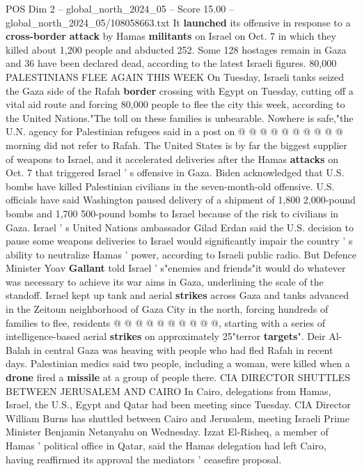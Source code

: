 \begin{textsample}{POS Dim 2 – global\_north\_2024\_05 – Score 15.00 – global\_north\_2024\_05/108058663.txt}
It \textbf{launched} its offensive in response to a \textbf{cross-border} \textbf{attack} by Hamas \textbf{militants} on Israel on Oct. 7 in which they killed about 1,200 people and abducted 252.
Some 128 hostages remain in Gaza and 36 have been declared dead, according to the latest Israeli figures. 80,000 PALESTINIANS FLEE AGAIN THIS WEEK On Tuesday, Israeli tanks seized the Gaza side of the Rafah \textbf{border} crossing with Egypt on Tuesday, cutting off a vital aid route and forcing 80,000 people to flee the city this week, according to the United Nations."The toll on these families is unbearable.
Nowhere is safe,"the U.N. agency for Palestinian refugees said in a post on @ @ @ @ @ @ @ @ @ @ morning did not refer to Rafah.
The United States is by far the biggest supplier of weapons to Israel, and it accelerated deliveries after the Hamas \textbf{attacks} on Oct. 7 that triggered Israel ' s offensive in Gaza.
Biden acknowledged that U.S. bombs have killed Palestinian civilians in the seven-month-old offensive.
U.S. officials have said Washington paused delivery of a shipment of 1,800 2,000-pound bombs and 1,700 500-pound bombs to Israel because of the risk to civilians in Gaza.
Israel ' s United Nations ambassador Gilad Erdan said the U.S. decision to pause some weapons deliveries to Israel would significantly impair the country ' s ability to neutralize Hamas ' power, according to Israeli public radio.
But Defence Minister Yoav \textbf{Gallant} told Israel ' s"enemies and friends"it would do whatever was necessary to achieve its war aims in Gaza, underlining the scale of the standoff.
Israel kept up tank and aerial \textbf{strikes} across Gaza and tanks advanced in the Zeitoun neighborhood of Gaza City in the north, forcing hundreds of families to flee, residents @ @ @ @ @ @ @ @ @ @, starting with a series of intelligence-based aerial \textbf{strikes} on approximately 25"terror \textbf{targets}".
Deir Al-Balah in central Gaza was heaving with people who had fled Rafah in recent days.
Palestinian medics said two people, including a woman, were killed when a \textbf{drone} fired a \textbf{missile} at a group of people there.
CIA DIRECTOR SHUTTLES BETWEEN JERUSALEM AND CAIRO In Cairo, delegations from Hamas, Israel, the U.S., Egypt and Qatar had been meeting since Tuesday.
CIA Director William Burns has shuttled between Cairo and Jerusalem, meeting Israeli Prime Minister Benjamin Netanyahu on Wednesday.
Izzat El-Risheq, a member of Hamas ' political office in Qatar, said the Hamas delegation had left Cairo, having reaffirmed its approval the mediators ' ceasefire proposal.

\end{textsample}
